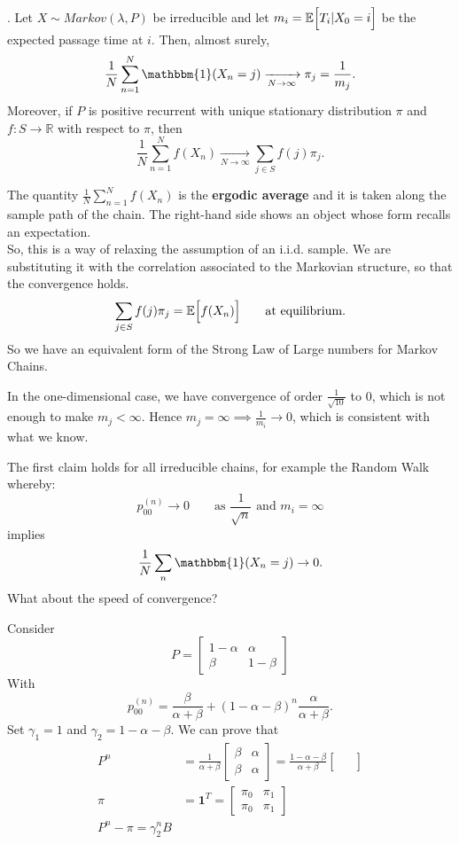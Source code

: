 \documentclass{article}
\begin{document}
\begin{theorem}
    . Let $X\sim Markov(\lambda,P)$ be irreducible and let $m_i=\mathbb{E}\Bigl[T_i|X_0=i\Bigr]$ be the expected passage time at $i$. Then, almost surely,
        \[\frac{1}{N}\sum_{n=1}^N\mathbbm{1}(X_n=j)\xrightarrow[N\rightarrow\infty]{}\pi_j=\frac{1}{m_j}.\]
        Moreover, if $P$ is positive recurrent with unique stationary distribution $\pi$ and $f:S\rightarrow\mathbb{R}$ with respect to $\pi$, then
        \[\frac{1}{N}\sum_{n=1}^Nf(X_n)\xrightarrow[N\rightarrow\infty]{}\sum_{j\in S}f(j)\pi_j.\]
\end{theorem}
The quantity $\frac{1}{N}\sum_{n=1}^Nf(X_n)$ is the \textbf{ergodic average} and it is taken along the sample path of the chain. The right-hand side shows an object whose form recalls an expectation. \\
So, this is a way of relaxing the assumption of an i.i.d. sample. We are substituting it with the correlation associated to the Markovian structure, so that the convergence holds. 
\[\sum_{j\in S}f(j)\pi_j=\mathbb{E}\Bigl[{f(X_n)}\Bigr] \qquad \text{at equilibrium.}\]
So we have an equivalent form of the Strong Law of Large numbers for Markov Chains.
\begin{remark}
    In the one-dimensional case, we have convergence of order $\frac{1}{\sqrt{10}}$ to $0$, which is not enough to make $m_j < \infty$. Hence $m_j = \infty \implies \frac{1}{m_i} \rightarrow 0$, which is consistent with what we know.
\end{remark}
The first claim holds for all irreducible chains, for example the Random Walk whereby:
\[p_{00}^{(n)}\rightarrow0 \qquad\text{as }\frac{1}{\sqrt{n}}\text{ and }m_i=\infty\]
implies
\[\frac{1}{N}\sum_n\mathbbm{1}(X_n=j)\rightarrow0.\]
What about the speed of convergence?
\begin{example}
    Consider \[   P=\begin{bmatrix}
            1-\alpha & \alpha \\
            \beta & 1-\beta
        \end{bmatrix}\]
With
\[
p_{00}^{(n)}=\frac{\beta}{\alpha+\beta}+(1-\alpha-\beta)^n\frac{\alpha}{\alpha+\beta}.
\]
Set $\gamma_1=1$ and $\gamma_2=1-\alpha-\beta$.
We can prove that
\begin{align*}
    P^n &=\frac{1}{\alpha+\beta}\begin{bmatrix}
            \beta & \alpha \\
            \beta & \alpha
        \end{bmatrix}=\frac{1-\alpha-\beta}{\alpha+\beta}\begin{bmatrix}
           & \\
         & \\
        \end{bmatrix}\\
        \pi &=\mathbf{1}^T=\begin{bmatrix}
            \pi_0 & \pi_1 \\
            \pi_0 & \pi_1
        \end{bmatrix}\\
        P^n-\pi=\gamma_2^n B
\end{align*} %
\end{example}
\end{document}
